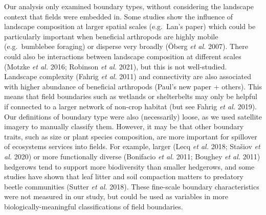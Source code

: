 \documentclass[]{elsarticle} %
\begin{document}
Our analysis only examined boundary types, without considering the landscape context that fields were embedded in.
Some studies show the influence of landscape composition at larger spatial scales (e.g.~Lan's paper) which could be particularly important when beneficial arthropods are highly mobile (e.g.~bumblebee foraging) or disperse very broadly (Öberg \emph{et al.} 2007).
There could also be interactions between landscape composition at different scales (Motzke \emph{et al.} 2016; Robinson \emph{et al.} 2021), but this is not well-studied.
Landscape complexity (Fahrig \emph{et al.} 2011) and connectivity are also associated with higher abundance of beneficial arthropods (Paul's new paper + others).
This means that field boundaries such as wetlands or shelterbelts may only be helpful if connected to a larger network of non-crop habitat (but see Fahrig \emph{et al.} 2019).
Our definitions of boundary type were also (necessarily) loose, as we used satellite imagery to manually classify them.
However, it may be that other boundary traits, such as size or plant species composition, are more important for spillover of ecosystems services into fields.
For example, larger (Lecq \emph{et al.} 2018; Stašiov \emph{et al.} 2020) or more functionally diverse (Bonifacio \emph{et al.} 2011; Boughey \emph{et al.} 2011) hedgerows tend to support more biodiversity than smaller hedgerows, and some studies have shown that leaf litter and soil compaction matters to predatory beetle communities (Sutter \emph{et al.} 2018).
These fine-scale boundary characteristics were not measured in our study, but could be used as variables in more biologically-meaningful classifications of field boundaries.
\end{document}
